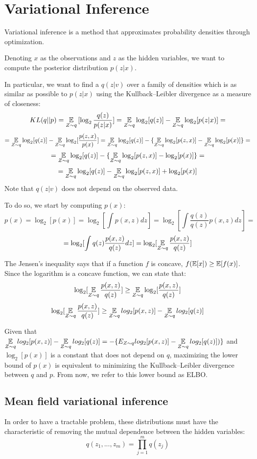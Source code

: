 \chapter{Variational Inference} \label{vi}
Variational inference is a method that approximates probability densities through optimization.

Denoting $x$ as the observations and $z$ as the hidden variables,
we want to compute the posterior distribution $p(z | x)$.

In particular, we want to find a $q(z | v)$ over a family of densities
which is as similar as possible to $p(z | x)$ using the Kullback–Leibler divergence as a measure of closeness:
$$ KL(q || p) = \operatorname*{\mathbb{E}}_{Z \sim q} {[\log_2 \frac{q(z)}{p(z | x)}]} = \operatorname*{\mathbb{E}}_{Z \sim q} \log_2 [q(z)] - \operatorname*{\mathbb{E}}_{Z \sim q} \log_2 [p(z | x)] = $$
$$ = \operatorname*{\mathbb{E}}_{Z \sim q} \log_2 [q(z)] - \operatorname*{\mathbb{E}}_{Z \sim q} \log_2 [\frac{p(z,x)}{p(x)}] = \operatorname*{\mathbb{E}}_{Z \sim q} \log_2 [q(z)] - \{ \operatorname*{\mathbb{E}}_{Z \sim q} \log_2 [p(z,x)] - \operatorname*{\mathbb{E}}_{Z \sim q} \log_2 [p(x)] \} = $$
$$ = \operatorname*{\mathbb{E}}_{Z \sim q} \log_2 [q(z)] - \{ \operatorname*{\mathbb{E}}_{Z \sim q} \log_2 [p(z,x)] - \log_2 [p(x)] \} = $$
$$ = \operatorname*{\mathbb{E}}_{Z \sim q} \log_2 [q(z)] - \operatorname*{\mathbb{E}}_{Z \sim q} \log_2 [p(z,x)] + \log_2 [p(x)] $$
Note that $q(z | v)$ does not depend on the observed data.

To do so, we start by computing $p(x)$:
$$
    \displaystyle p(x) = \log_2[p(x)] = \log_2[\int p(x,z) dz]
    = \log_2[\int \frac{q(z)}{q(z)} p(x,z) dz] =
$$
$$
    = \log_2[\int q(z) \frac{p(x,z)}{q(z)} dz]
    = \log_2[\operatorname*{\mathbb{E}}_{Z \sim q} \frac{p(x,z)}{q(z)}]
$$

The Jensen's inequality says that if a function $f$ is concave, $f(\operatorname*{\mathbb{E}}[x]) \geq \operatorname*{\mathbb{E}}[f(x)]$.
Since the logarithm is a concave function, we can state that:
$$ \log_2[\operatorname*{\mathbb{E}}_{Z \sim q} \frac{p(x,z)}{q(z)}] \geq \operatorname*{\mathbb{E}}_{Z \sim q} \log_2[\frac{p(x,z)}{q(z)}] $$
$$ \log_2[\operatorname*{\mathbb{E}}_{Z \sim q} \frac{p(x,z)}{q(z)}] \geq \operatorname*{\mathbb{E}}_{Z \sim q} log_2[p(x,z)] - \operatorname*{\mathbb{E}}_{Z \sim q} log_2[q(z)] $$

Given that $ \displaystyle \operatorname*{\mathbb{E}}_{Z \sim q} log_2[p(x,z)] - \operatorname*{\mathbb{E}}_{Z \sim q} log_2[q(z)] = -\{E_{Z \sim q} log_2[p(x,z)] - \operatorname*{\mathbb{E}}_{Z \sim q} log_2[q(z)])\}$
and $\log_2[p(x)]$ is a constant that does not depend on $q$,
maximizing the lower bound of $p(x)$ is equivalent to minimizing the Kullback–Leibler divergence between $q$ and $p$.
From now, we refer to this lower bound as ELBO.

\section{Mean field variational inference}
In order to have a tractable problem, these distributions must have the characteristic
of removing the mutual dependence between the hidden variables:
$$ q(z_1, ..., z_m) = \prod_{j=1}^m q(z_j) $$

